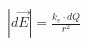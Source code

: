 \documentclass[preview]{standalone}
\begin{document}
\begin{align*}
|d\vec{E}| = \frac{k_e \cdot dQ}{r^2}
\end{align*}
\end{document}
